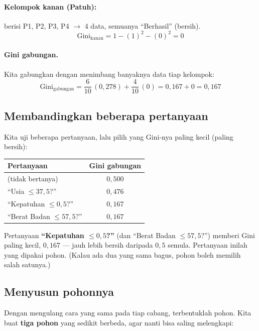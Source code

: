 \documentclass[11pt,a4paper]{article}
\begin{document}
\paragraph{Kelompok kanan (Patuh):} berisi P1, P2, P3, P4 $\to$ 4 data, semuanya ``Berhasil''
(bersih).
\[ \text{Gini}_{\text{kanan}} = 1 - (1)^2 - (0)^2 = 0 \]

\paragraph{Gini gabungan.} Kita gabungkan dengan menimbang banyaknya data tiap kelompok:
\[
\text{Gini}_{\text{gabungan}} = \frac{6}{10}\,(0{,}278) + \frac{4}{10}\,(0) = 0{,}167 + 0 = 0{,}167
\]

\subsection{Membandingkan beberapa pertanyaan}

Kita uji beberapa pertanyaan, lalu pilih yang Gini-nya paling kecil (paling bersih):

\begin{center}
\begin{tabular}{lc}
\toprule
\textbf{Pertanyaan} & \textbf{Gini gabungan} \\
\midrule
(tidak bertanya)              & $0{,}500$ \\
``Usia $\le 37{,}5$?''        & $0{,}476$ \\
``Kepatuhan $\le 0{,}5$?''    & $0{,}167$ \\
``Berat Badan $\le 57{,}5$?'' & $0{,}167$ \\
\bottomrule
\end{tabular}
\end{center}

\begin{hasil}
Pertanyaan \textbf{``Kepatuhan $\le 0{,}5$?''} (dan ``Berat Badan $\le 57{,}5$?'') memberi
Gini paling kecil, $0{,}167$ --- jauh lebih bersih daripada $0{,}5$ semula. Pertanyaan inilah
yang dipakai pohon. (Kalau ada dua yang sama bagus, pohon boleh memilih salah satunya.)
\end{hasil}

\subsection{Menyusun pohonnya}

Dengan mengulang cara yang sama pada tiap cabang, terbentuklah pohon. Kita buat \textbf{tiga
pohon} yang sedikit berbeda, agar nanti bisa saling melengkapi:
\end{document}

